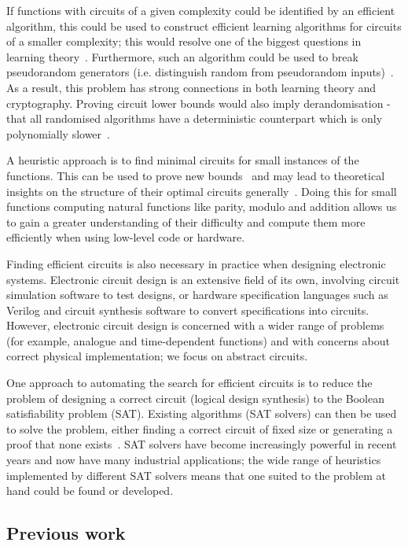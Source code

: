 \documentclass{article}
\begin{document}
If functions with circuits of a given complexity could be identified by an efficient algorithm, this could be used to construct efficient learning algorithms for circuits of a smaller complexity; this would resolve one of the biggest questions in learning theory~\cite{carmosino}. Furthermore, such an algorithm could be used to break pseudorandom generators (i.e. distinguish random from pseudorandom inputs)~\cite{razborov94}. As a result, this problem has strong connections in both learning theory and cryptography. Proving circuit lower bounds would also imply derandomisation - that all randomised algorithms have a deterministic counterpart which is only polynomially slower~\cite{arora}.

A heuristic approach is to find minimal circuits for small instances of the functions. This can be used to prove new bounds~\cite{kulikovsurvey} and may lead to theoretical insights on the structure of their optimal circuits generally~\cite{williams}. Doing this for small functions computing natural functions like parity, modulo and addition allows us to gain a greater understanding of their difficulty and compute them more efficiently when using low-level code or hardware. 

Finding efficient circuits is also necessary in practice when designing electronic systems. Electronic circuit design is an extensive field of its own, involving circuit simulation software to test designs, or hardware specification languages such as Verilog and circuit synthesis software to convert specifications into circuits. However, electronic circuit design is concerned with a wider range of problems (for example, analogue and time-dependent functions) and with concerns about correct physical implementation; we focus on abstract circuits.

One approach to automating the search for efficient circuits is to reduce the problem of designing a correct circuit (logical design synthesis) to the Boolean satisfiability problem (SAT). Existing algorithms (SAT solvers) can then be used to solve the problem, either finding a correct circuit of fixed size or generating a proof that none exists~\cite{kulikov}. SAT solvers have become increasingly powerful in recent years and now have many industrial applications\cite{prasad}; the wide range of heuristics implemented by different SAT solvers means that one suited to the problem at hand could be found or developed. 

\subsection{Previous work}
\end{document}

